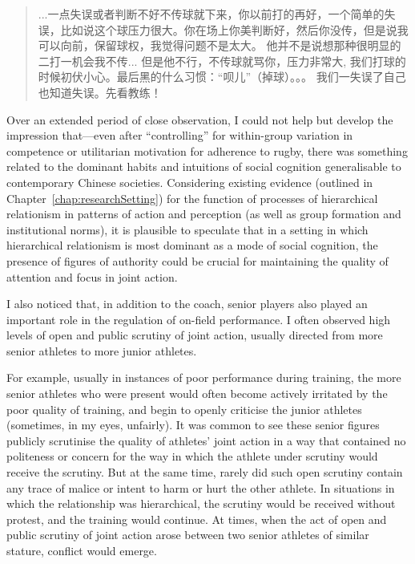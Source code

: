 \begin{CJK}{UTF8}{gbsn}
       \begin{quote}
            ...一点失误或者判断不好不传球就下来，你以前打的再好，一个简单的失误，比如说这个球压力很大。你在场上你美判断好，然后你没传，但是说我可以向前，保留球权，我觉得问题不是太大。
           他并不是说想那种很明显的二打一机会我不传...
            但是他不行，不传球就骂你，压力非常大, 我们打球的时候初伏小心。最后黑的什么习惯：“呗儿”（掉球）。。。 我们一失误了自己也知道失误。先看教练！
      \end{quote}

Over an extended period of close observation, I could not help but develop the impression that---even after ``controlling'' for within-group variation in competence or utilitarian motivation for adherence to rugby, there was something related to the dominant habits and intuitions of social cognition generalisable to contemporary Chinese societies.  Considering existing evidence (outlined in Chapter~\ref{chap:researchSetting}) for the function of processes of hierarchical relationism in patterns of action and perception (as well as group formation and institutional norms), it is plausible to speculate that in a setting in which hierarchical relationism is most dominant as a mode of social cognition, the presence of figures of authority could be crucial for maintaining the quality of attention and focus in joint action.

I also noticed that, in addition to the coach, senior players also played an important role in the regulation of on-field performance.
I often observed high levels of open and public scrutiny of joint action, usually directed from more senior athletes to more junior athletes.

For example, usually in instances of poor performance during training, the more senior athletes who were present would often become actively irritated by the poor quality of training, and begin to openly criticise the junior athletes (sometimes, in my eyes, unfairly).
It was common to see these senior figures publicly scrutinise the quality of athletes' joint action in a way that contained no politeness or concern for the way in which the athlete under scrutiny would receive the scrutiny. But at the same time, rarely did such open scrutiny contain any trace of malice or intent to harm or hurt the other athlete. In situations in which the relationship was hierarchical, the scrutiny would be received without protest, and the training would continue.   At times, when the act of open and public scrutiny of joint action arose between two senior athletes of similar stature, conflict would emerge.


\end{CJK}
